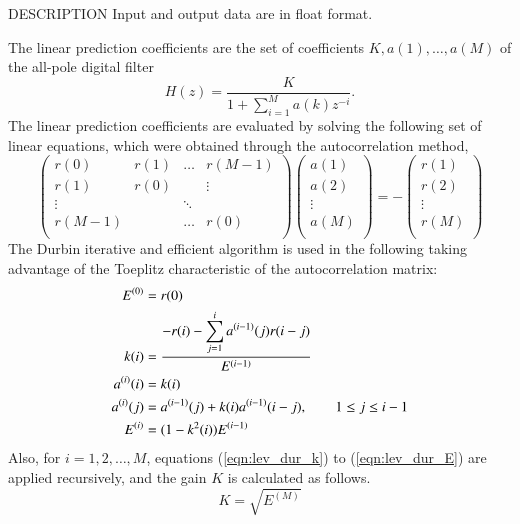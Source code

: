 \begin{qsection}{DESCRIPTION}
Input and output data are in float format.
\par
The linear prediction coefficients are the set of coefficients
$K, a(1), \dots, a(M)$ of the all-pole digital filter
\begin{displaymath}
H(z) = \frac{K}{\displaystyle{1+\sum_{i=1}^{M}a(k)z^{-i}}}.
\end{displaymath}
The linear prediction coefficients are evaluated by solving
the following set of linear equations, which were obtained
through the autocorrelation method,
\begin{displaymath}
\begin{pmatrix}
        r(0) & r(1) & \dots & r(M-1) \\
        r(1) & r(0) &        & \vdots \\
        \vdots &    & \ddots &         \\
        r(M-1) &    & \dots & r(0)   \\
\end{pmatrix}
\begin{pmatrix}
	a(1) \\
	a(2) \\
	\vdots \\
	a(M) \\
\end{pmatrix}
= - 
\begin{pmatrix}
	r(1) \\
	r(2) \\
	\vdots \\
	r(M) \\
\end{pmatrix}
\end{displaymath}
The Durbin iterative and efficient algorithm is used
in the following taking advantage of the Toeplitz characteristic
of the autocorrelation matrix:
\begin{align}
E^{(0)}    &= r(0) \notag \\
k(i)       &= \frac{\displaystyle{-r(i)-\sum_{j=1}^i a^{(i-1)}(j)r(i-j)}}
		{E^{(i-1)}} \label{eqn:lev_dur_k}\notag\\
a^{(i)}(i) &= k(i) \notag\\
a^{(i)}(j) &=  a^{(i-1)}(j) + k(i) a^{(i-1)}(i-j), 
		\qquad 1\leq j \leq i-1\\
E^{(i)}    &= (1-k^2(i)) E^{(i-1)} \label{eqn:lev_dur_E}
\end{align}
Also, for $i=1,2,\ldots,M$, equations (\ref{eqn:lev_dur_k}) to
 (\ref{eqn:lev_dur_E}) are applied recursively,
and the gain $K$ is calculated as follows.
\begin{displaymath}
K = \sqrt{E^{(M)}}
\end{displaymath}
\end{qsection}

